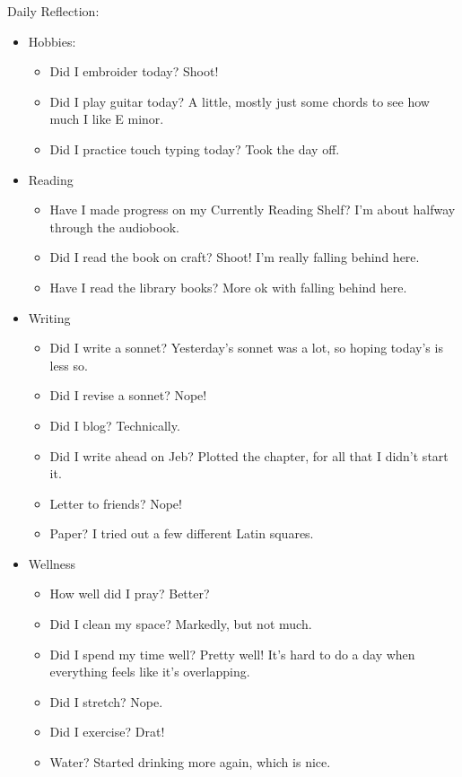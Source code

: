 \documentclass[12pt]{article}[titlepage]
\newcommand{\1}{\={a}}
\newcommand{\2}{\={e}}
\newcommand{\3}{\={\i}}
\newcommand{\4}{\=o}
\newcommand{\5}{\=u}
\newcommand{\6}{\={A}}
\renewcommand{\,}{\textsuperscript{,}}
\begin{document}
Daily Reflection:
\begin{itemize}
\item Hobbies:
\begin{itemize}
\item Did I embroider today? Shoot!
\item Did I play guitar today? A little, mostly just some chords to see how much I like E minor.
\item Did I practice touch typing today? Took the day off.
\end{itemize}
\item Reading
\begin{itemize}
\item Have I made progress on my Currently Reading Shelf? I'm about halfway through the audiobook.
\item Did I read the book on craft? Shoot! I'm really falling behind here.
\item Have I read the library books? More ok with falling behind here.
\end{itemize}
\item Writing
\begin{itemize}
\item Did I write a sonnet? Yesterday's sonnet was a lot, so hoping today's is less so.
\item Did I revise a sonnet? Nope!
\item Did I blog? Technically.
\item Did I write ahead on Jeb? Plotted the chapter, for all that I didn't start it.
\item Letter to friends? Nope!
\item Paper? I tried out a few different Latin squares.
\end{itemize}
\item Wellness
\begin{itemize}
\item How well did I pray? Better?
\item Did I clean my space? Markedly, but not much.
\item Did I spend my time well? Pretty well! It's hard to do a day when everything feels like it's overlapping.
\item Did I stretch? Nope.
\item Did I exercise? Drat!
\item Water? Started drinking more again, which is nice.
\end{itemize}
\end{itemize}
\end{document}

